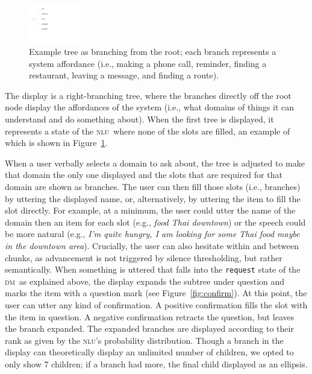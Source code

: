 \documentclass[11pt]{article}
\newcommand{\nlu}[0]{\textsc{nlu}}
\newcommand{\dm}[0]{\textsc{dm}}
\begin{document}
\begin{figure}
  \centering
      \includegraphics[width=0.2\textwidth]{figures/diatree-affordances.pdf}	
      \caption{Example tree as branching from the root; each branch represents a system affordance (i.e., making a phone call, reminder, finding a restaurant, leaving a message, and finding a route). \label{fig:affordances}}
\end{figure}

The display is a right-branching tree, where the branches directly off the root node display the affordances of the system (i.e., what domains of things it can understand and do something about). When the first tree is displayed, it represents a state of the \nlu\ where none of the slots are filled, an example of which is shown in Figure~\ref{fig:affordances}. 

When a user verbally selects a domain to ask about, the tree is adjusted to make that domain the only one displayed and the slots that are required for that domain are shown as branches. The user can then fill those slots (i.e., branches) by uttering the displayed name, or, alternatively, by uttering the item to fill the slot directly. For example, at a minimum, the user could utter the name of the domain then an item for each slot (e.g.,  \emph{food Thai downtown}) or the speech could be more natural (e.g., \emph{I'm quite hungry, I am looking for some Thai food maybe in the downtown area}). Crucially, the user can also hesitate within and between chunks, as advancement is not triggered by silence thresholding, but rather semantically.
When something is uttered that falls into the \texttt{request} state of the \dm\ as explained above, the display expands the subtree under question and marks the item with a question mark (see Figure~\ref{fig:confirm}). At this point, the user can utter any kind of confirmation. A positive confirmation fills the slot with the item in question. A negative confirmation retracts the question, but leaves the branch expanded. The expanded branches are displayed according to their rank as given by the \nlu's probability distribution. Though a branch in the display can theoretically display an unlimited number of children, we opted to only show 7 children; if a branch had more, the final child displayed as an ellipsis. 
\end{document}
